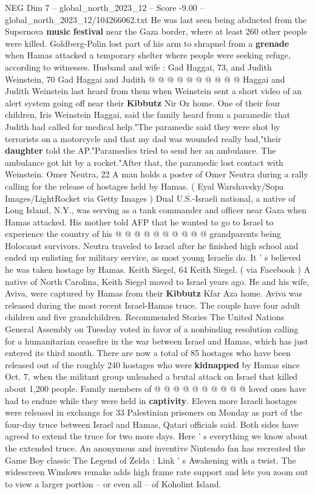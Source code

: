 \begin{textsample}{NEG Dim 7 – global\_north\_2023\_12 – Score -9.00 – global\_north\_2023\_12/104266062.txt}
He was last seen being abducted from the Supernova \textbf{music} \textbf{festival} near the Gaza border, where at least 260 other people were killed.
Goldberg-Polin lost part of his arm to shrapnel from a \textbf{grenade} when Hamas attacked a temporary shelter where people were seeking refuge, according to witnesses.
Husband and wife : Gad Haggai, 73, and Judith Weinstein, 70 Gad Haggai and Judith @ @ @ @ @ @ @ @ @ @ Haggai and Judith Weinstein last heard from them when Weinstein sent a short video of an alert system going off near their \textbf{Kibbutz} Nir Oz home.
One of their four children, Iris Weinstein Haggai, said the family heard from a paramedic that Judith had called for medical help."The paramedic said they were shot by terrorists on a motorcycle and that my dad was wounded really bad,"their \textbf{daughter} told the AP."Paramedics tried to send her an ambulance.
The ambulance got hit by a rocket."After that, the paramedic lost contact with Weinstein.
Omer Neutra, 22 A man holds a poster of Omer Neutra during a rally calling for the release of hostages held by Hamas. ( Eyal Warshavsky/Sopa Images/LightRocket via Getty Images ) Dual U.S.-Israeli national, a native of Long Island, N.Y., was serving as a tank commander and officer near Gaza when Hamas attacked.
His mother told AFP that he wanted to go to Israel to experience the country of his @ @ @ @ @ @ @ @ @ @ grandparents being Holocaust survivors.
Neutra traveled to Israel after he finished high school and ended up enlisting for military service, as most young Israelis do.
It ' s believed he was taken hostage by Hamas.
Keith Siegel, 64 Keith Siegel. ( via Facebook ) A native of North Carolina, Keith Siegel moved to Israel years ago.
He and his wife, Aviva, were captured by Hamas from their \textbf{Kibbutz} Kfar Aza home.
Aviva was released during the most recent Israel-Hamas truce.
The couple have four adult children and five grandchildren.
Recommended Stories The United Nations General Assembly on Tuesday voted in favor of a nonbinding resolution calling for a humanitarian ceasefire in the war between Israel and Hamas, which has just entered its third month.
There are now a total of 85 hostages who have been released out of the roughly 240 hostages who were \textbf{kidnapped} by Hamas since Oct. 7, when the militant group unleashed a brutal attack on Israel that killed about 1,200 people.
Family members of @ @ @ @ @ @ @ @ @ @ loved ones have had to endure while they were held in \textbf{captivity}.
Eleven more Israeli hostages were released in exchange for 33 Palestinian prisoners on Monday as part of the four-day truce between Israel and Hamas, Qatari officials said.
Both sides have agreed to extend the truce for two more days.
Here ' s everything we know about the extended truce.
An anonymous and inventive Nintendo fan has recreated the Game Boy classic The Legend of Zelda : Link ' s Awakening with a twist.
The widescreen Windows remake adds high frame rate support and lets you zoom out to view a larger portion -- or even all -- of Koholint Island.

\end{textsample}
